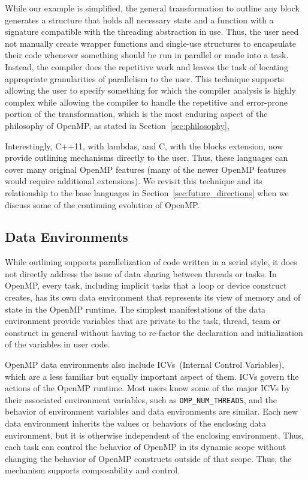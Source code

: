 While our example is simplified, the general transformation to outline any 
block generates a structure that holds all necessary state and a function 
with a signature compatible with the threading abstraction in use. Thus, 
the user need not manually create wrapper functions and single-use structures 
to encapsulate their code whenever something should be run in parallel or 
made into a task. Instead, the compiler does the repetitive work and leaves
the task of locating appropriate granularities of parallelism to the user.
This technique supports allowing the user to specify something for which the
compiler analysis is highly complex while allowing the compiler to handle the
repetitive and error-prone portion of the transformation, which is the most 
enduring aspect of the philosophy of OpenMP, as stated in 
Section~\ref{sec:philosophy}, 

Interestingly, C++11, with lambdas, and C, with the blocks extension, now 
provide outlining mechanisms directly to the user. Thus, these languages
can cover many original OpenMP features (many of the newer OpenMP features
would require additional extensions). We revisit this technique and its
relationship to the base languages in Section~\ref{sec:future_directions} 
when we discuss some of the continuing evolution of OpenMP.

\subsection{Data Environments}
\label{sub:data_environments}

While outlining supports parallelization of code written in a serial style, 
it does not directly address the issue of data sharing between threads or 
tasks. In OpenMP, every task, including implicit tasks that a loop or 
device construct creates, has its own data environment that represents its 
view of memory and of state in the OpenMP runtime. The simplest manifestations
of the data environment provide variables that are private to the task, 
thread, team or construct in general without having to re-factor the 
declaration and initialization of the variables in user code.

OpenMP data environments also include ICVs~(Internal Control Variables),
which are a less familiar but equally important aspect of them. ICVs govern
the actions of the OpenMP runtime. Most users know some of the major ICVs by 
their associated environment variables, such as \texttt{OMP\_NUM\_THREADS}, 
and the behavior of environment variables and data environments are similar. 
Each new data environment inherits the values or behaviors of the enclosing 
data environment, but it is otherwise independent of the enclosing environment.
Thus, each task can control the behavior of OpenMP in its dynamic scope 
without changing the behavior of OpenMP constructs outside of that scope.
Thus, the mechanism supports composability and control.

